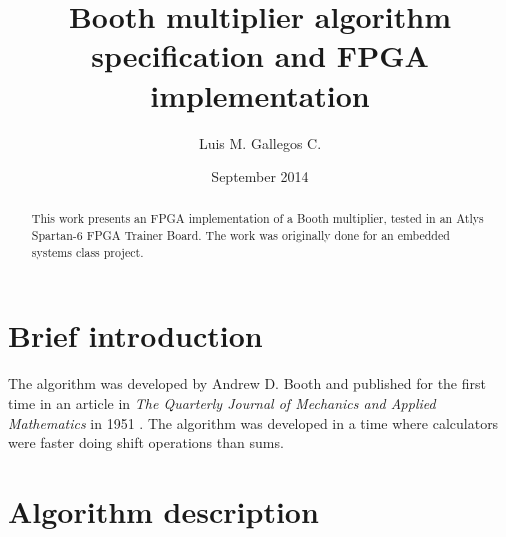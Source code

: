 \documentclass[titlepage]{article}%
\begin{document}
\title{Booth multiplier algorithm specification and FPGA implementation}
\author{Luis M. Gallegos C.}
\date{September 2014}
\maketitle

\begin{abstract}
    This work presents an FPGA implementation of a Booth multiplier, tested in an Atlys Spartan-6 FPGA Trainer Board.
    The work was originally done for an embedded systems class project.
\end{abstract}

\section{Brief introduction} %
\label{sec:brief_introduction}

The algorithm was developed by Andrew D. Booth and published for the first time in an article in \emph{The Quarterly Journal of Mechanics and Applied Mathematics} in 1951 \cite{Booth1951Signed}.
The algorithm was developed in a time where calculators were faster doing shift operations than sums.\par




\section{Algorithm description} %
\label{sec:algorithm_description}






\end{document}
